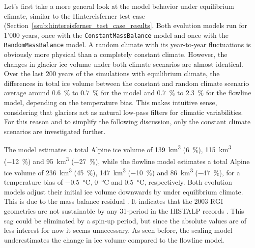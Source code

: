         Let's first take a more general look at the model behavior under equilibrium climate, similar to the Hintereisferner test case (Section~\ref{ssub:hintereisferner_test_case_results}. Both evolution models run for 1'000 years, once with the \lstinline`ConstantMassBalance` model and once with the \lstinline`RandomMassBalance` model. A random climate with its year-to-year fluctuations is obviously more physical than a completely constant climate. However, the changes in glacier ice volume under both climate scenarios are almost identical. Over the last 200 years of the simulations with equilibrium climate, the differences in total ice volume between the constant and random climate scenario average around \SI{0.6}{\percent} to \SI{0.7}{\percent} for the \vas{} model and \SI{0.7}{\percent} to \SI{2.3}{\percent} for the flowline model, depending on the temperature bias. This makes intuitive sense, considering that glaciers act as natural low-pass filters for climatic variabilities. For this reason and to simplify the following discussion, only the constant climate scenarios are investigated further.

        The \vas{} model estimates a total Alpine ice volume of \SI{139}{\cubic\kilo\meter} (\SI{+6}{\percent}), \SI{115}{\cubic\kilo\meter} (\SI{-12}{\percent}) and \SI{95}{\cubic\kilo\meter} (\SI{-27}{\percent}), while the flowline model estimates a total Alpine ice volume of \SI{236}{\cubic\kilo\meter} (\SI{+45}{\percent}), \SI{147}{\cubic\kilo\meter} (\SI{-10}{\percent}) and \SI{86}{\cubic\kilo\meter} (\SI{-47}{\percent}), for a temperature bias of \SI{-.5}{\celsius}, \SI{0}{\celsius} and \SI{+.5}{\celsius}, respectively. 
        Both evolution models adjust their initial ice volume downwards by under equilibrium climate. This is due to the mass balance residual \bias{}. It indicates that the 2003 RGI geometries are not sustainable by any 31-period in the HISTALP records \citep{Maussion2019}. This sag could be eliminated by a spin-up period, but since the absolute values are of less interest for now it seems unnecessary.
        As seen before, the \vas{} scaling model underestimates the change in ice volume compared to the flowline model.

